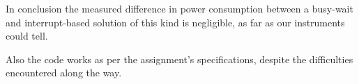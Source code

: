 In conclusion the measured difference in power consumption between a busy-wait and interrupt-based solution of this kind is negligible, as far as our instruments could tell.

Also the code works as per the assignment's specifications, despite the difficulties encountered along the way.
